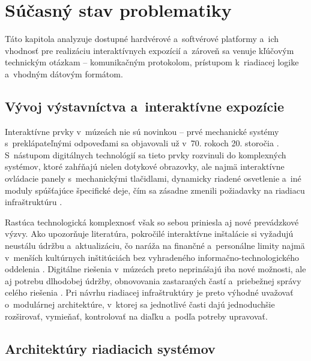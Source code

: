 \chapter{Súčasný stav problematiky}
\label{SucasnyStav}

Táto kapitola analyzuje dostupné hardvérové
a~softvérové platformy a~ich vhodnosť pre realizáciu
interaktívnych expozícií a~zároveň sa venuje kľúčovým technickým
otázkam -- komunikačným protokolom, prístupom k~riadiacej logike
a~vhodným dátovým formátom.

\section{Vývoj výstavníctva a~interaktívne expozície}
\label{EvoluciaVystavnictva}

Interaktívne prvky v~múzeách nie sú novinkou -- prvé mechanické
systémy s~preklápateľnými odpoveďami sa objavovali už v~70. rokoch
20. storočia \cite{interactive_small_museums}. S~nástupom digitálnych technológií
sa tieto prvky rozvinuli do komplexných systémov, ktoré zahŕňajú nielen dotykové obrazovky,
ale najmä interaktívne ovládacie panely s~mechanickými tlačidlami, dynamicky riadené osvetlenie
a~iné moduly spúšťajúce špecifické deje, čím sa zásadne zmenili
požiadavky na riadiacu infraštruktúru \cite{museum_immersive_design}.

Rastúca technologická komplexnosť však so sebou priniesla aj nové
prevádzkové výzvy. Ako upozorňuje literatúra, pokročilé
interaktívne inštalácie si vyžadujú neustálu údržbu a~aktualizáciu,
čo naráža na finančné a~personálne limity najmä v~menších kultúrnych
inštitúciách bez vyhradeného informačno-technologického oddelenia \cite{shehade2020}.
Digitálne riešenia v~múzeách preto neprinášajú iba nové možnosti,
ale aj potrebu dlhodobej údržby, obnovovania zastaraných častí
a~priebežnej správy celého riešenia \cite{bachi2024}. Pri návrhu
riadiacej infraštruktúry je preto výhodné uvažovať o~modulárnej
architektúre, v~ktorej sa jednotlivé časti dajú jednoduchšie rozširovať,
vymieňať, kontrolovať na diaľku a~podľa potreby upravovať.

\section{Architektúry riadiacich systémov}
\label{architektury-systemov}

